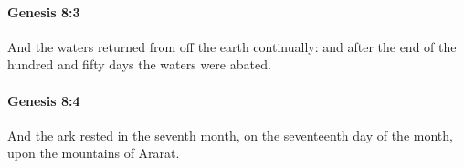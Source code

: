 		\paragraph{Genesis 8:3} %
			\label{GENESIS-8-3}

			And the waters returned from off the earth continually: and after the end of the hundred and fifty days the waters were abated.


		\paragraph{Genesis 8:4} %
			\label{GENESIS-8-4}

			And the ark rested in the seventh month, on the seventeenth day of the month, upon the mountains of Ararat.


